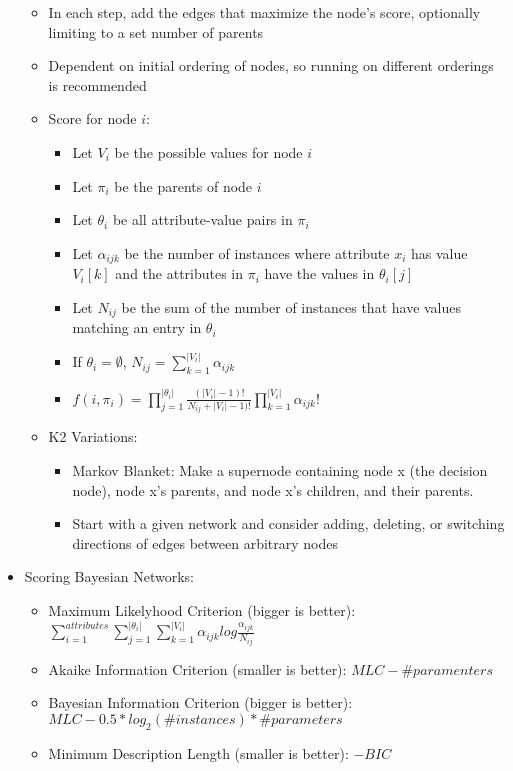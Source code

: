 \documentclass[fontsize=4pt]{scrartcl}
\begin{document}
\begin{multicols}{3}
\begin{itemize}
\begin{itemize}
			\item In each step, add the edges that maximize the node's score, optionally limiting to a set number of parents
			\item Dependent on initial ordering of nodes, so running on different orderings is recommended
			\item Score for node $i$:
				\begin{itemize}
					\item Let $V_i$ be the possible values for node $i$
					\item Let $\pi_i$ be the parents of node $i$
					\item Let $\theta_i$ be all attribute-value pairs in $\pi_i$
					\item Let $\alpha_{ijk}$ be the number of instances where attribute $x_i$ has value $V_i[k]$ and the attributes in $\pi_i$ have the values in $\theta_i[j]$
					\item Let $N_{ij}$ be the sum of the number of instances that have values matching an entry in $\theta_i$
					\item If $\theta_i = \emptyset$, $N_{ij} = \sum_{k=1}^{|V_i|} \alpha_{ijk}$
					\item $f(i, \pi_i) = \prod_{j=1}^{|\theta_i|} 	\frac{(|V_i| - 1)!}{N_{ij} + |V_i| - 1)!} \prod_{k=1}^{|V_i|} \alpha_{ijk}! $
				\end{itemize}
			\item K2 Variations:
				\begin{itemize}
					\item Markov Blanket: Make a supernode containing node x (the decision node), node x's parents, and node x's children, and their parents.
					\item Start with a given network and consider adding, deleting, or switching directions of edges between arbitrary nodes
				\end{itemize}
		\end{itemize}
	\item Scoring Bayesian Networks:
		\begin{itemize}
			\item Maximum Likelyhood Criterion (bigger is better): $\sum_{i=1}^{attributes}\sum_{j=1}^{|\theta_i|}\sum_{k=1}^{|V_i|} \alpha_{ijk} log \frac{\alpha_{ijk}}{N_ {ij}}$
			\item Akaike Information Criterion (smaller is better): $MLC - \#paramenters$
			\item Bayesian Information Criterion (bigger is better): $MLC - 0.5 * log_2(\#instances) * \#parameters$
			\item Minimum Description Length (smaller is better): $-BIC$
		\end{itemize}
\end{itemize}


\end{multicols}
\end{document}
